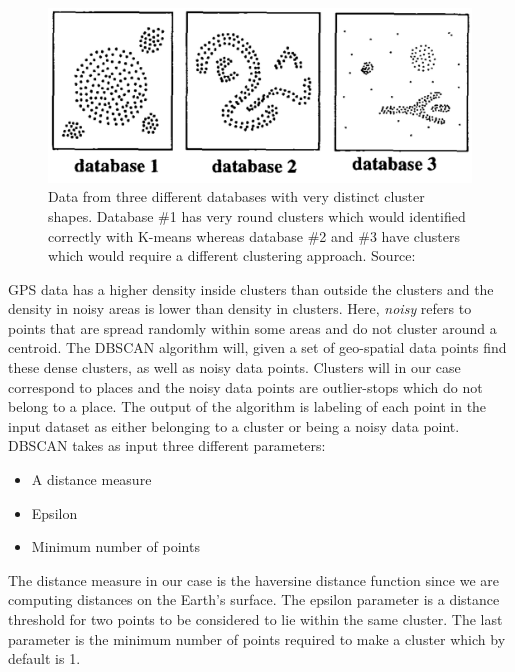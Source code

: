 \begin{figure}[h]
    \centering
    \includegraphics[width=\textwidth]{images/dbscan-clusters.png}
    \caption{Data from three different databases with very distinct cluster shapes. Database \#1 has very round clusters which would identified correctly with K-means whereas database \#2 and \#3 have clusters which would require a different clustering approach. Source: \cite{density-based-1996}}
    \label{fig:dbscan_shapes}
\end{figure}

GPS data has a higher density inside clusters than outside the clusters and the density in noisy areas is lower than density in clusters. Here, \textit{noisy} refers to points that are spread randomly within some areas and do not cluster around a centroid. The DBSCAN algorithm will, given a set of geo-spatial data points find these dense clusters, as well as noisy data points. Clusters will in our case correspond to places and the noisy data points are outlier-stops which do not belong to a place. The output of the algorithm is labeling of each point in the input dataset as either belonging to a cluster or being a noisy data point.\\

DBSCAN takes as input three different parameters:

\begin{itemize}
    \item A distance measure
    \item Epsilon
    \item Minimum number of points
\end{itemize}

The distance measure in our case is the haversine distance function since we are computing distances on the Earth's surface. The epsilon parameter is a distance threshold for two points to be considered to lie within the same cluster. The last parameter is the minimum number of points required to make a cluster which by default is 1. 

